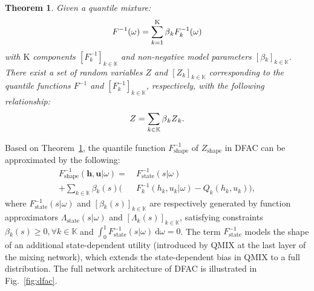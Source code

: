 \documentclass{article}
\newcommand{\state}{s}
\newcommand{\jointaction}{\mathbf{u}}
\newcommand{\action}{u}
\newcommand{\jointobservationhistory}{\mathbf{h}}
\newcommand{\observationhistory}{h}
\newcommand{\agentspace}{\mathbb{K}}
\newcommand{\agentcounter}{k}
\newcommand{\numberofagents}{\mathrm{K}}
\newcommand{\utilityexp}{Q}
\newcommand{\utility}{Z}
\newcommand{\quantilefunction}{F^{-1}}
\newcommand{\quantile}{\omega}
\newcommand{\modelparameter}{\beta}
\newcommand{\additionalparameterfunction}{\Lambda}
\newtheorem{theorem}{Theorem}[section]
\begin{document}
\begin{theorem}
\label{thm:sum_of_rv}
Given a quantile mixture:
\begin{equation}
\quantilefunction(\quantile{})=\sum^{\numberofagents{}}_{k=1}\modelparameter{}_{\agentcounter{}} \quantilefunction_{\agentcounter{}}(\quantile{})
\notag{}
\end{equation}
with $\numberofagents{}$ components $[\quantilefunction_{\agentcounter{}}]_{\agentcounter{}\in\agentspace{}}$ and non-negative model parameters $[\modelparameter{}_{\agentcounter{}}]_{\agentcounter{}\in\agentspace{}}$. There exist a set of random variables $\utility{}$ and $[\utility_{\agentcounter{}}]_{\agentcounter{}\in\agentspace{}}$  corresponding to the quantile functions $\quantilefunction$ and $[\quantilefunction_{\agentcounter{}}]_{\agentcounter{}\in\agentspace{}}$, respectively, with the following relationship:
\begin{equation}
\utility{}=\sum_{\agentcounter\in\agentspace{}}\modelparameter{}_{\agentcounter{}} \utility{}_{\agentcounter{}}.
\notag{}
\end{equation}
\end{theorem} 
Based on Theorem~\ref{thm:sum_of_rv}, the quantile function $\quantilefunction_{\mathrm{shape}}$ of $\utility_{\mathrm{shape}}$ in DFAC can be approximated by the following:
\begin{equation}
\begin{split}
\quantilefunction_{\mathrm{shape}}(\jointobservationhistory{},{\jointaction{}}\vert\quantile{})=\ &\quantilefunction_{\text{state}}(\state\vert\quantile{})\\
+\sum_{\agentcounter\in\agentspace{}}\modelparameter{}_{\agentcounter}(s)(&\quantilefunction_{\agentcounter}(\observationhistory{}_{\agentcounter{}},\action{}_{\agentcounter{}}\vert\quantile{})-\utilityexp_{\agentcounter}(\observationhistory{}_{\agentcounter{}},\action{}_{\agentcounter{}})),
\label{eq::dfac_approximation_equation}
\end{split}
\end{equation}
where $\quantilefunction_{\text{state}}(\state{}\vert\quantile{})$ and $[\modelparameter{}_{\agentcounter}(s)]_{\agentcounter{}\in\agentspace{}}$ are respectively generated by function approximators $\additionalparameterfunction_{\text{state}}(\state{}\vert\quantile{})$ and $[\additionalparameterfunction_{\agentcounter}(\state{})]_{\agentcounter{}\in\agentspace{}}$, satisfying constraints $\modelparameter{}_{\agentcounter}(s)\ge0, \forall\agentcounter{\in\agentspace{}}$ and $\int_0^1\quantilefunction_{\text{state}}(\state\vert\quantile{})\ \mathrm{d}\quantile=0$. The term $\quantilefunction_{\text{state}}$ models the shape of an additional state-dependent utility (introduced by QMIX at the last layer of the mixing network), which extends the state-dependent bias in QMIX to a full distribution. The full network architecture of DFAC is illustrated in Fig.~\ref{fig:dfac}.
\end{document}
